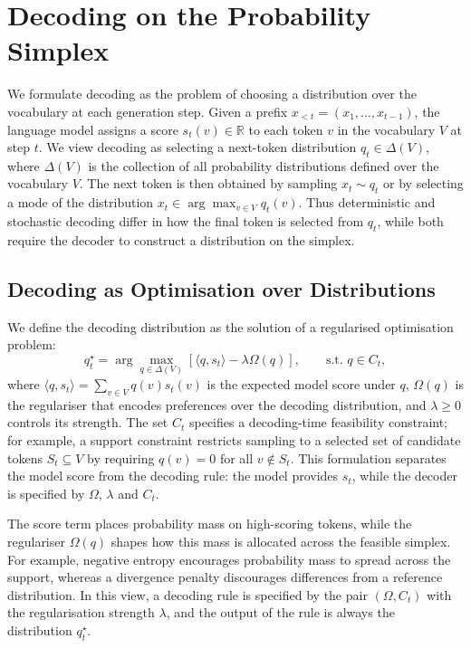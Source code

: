 \documentclass{article} %
\begin{document}
\section{Decoding on the Probability Simplex}
\label{sec:formulation}

We formulate decoding as the problem of choosing a distribution over the vocabulary at each generation step. Given a prefix $x_{<t}=(x_1,\ldots,x_{t-1})$, the language model assigns a score $s_t(v)\in\mathbb{R}$ to each
token $v$ in the vocabulary $V$ at step $t$. We view decoding as selecting a next-token distribution $q_t\in\Delta(V)$, where $\Delta (V)$ is the collection of all probability distributions defined over the vocabulary $V$.
The next token is then obtained by sampling $x_t\sim q_t$ or by selecting a mode of the distribution $x_t\in\arg\max_{v\in V} q_t(v)$. Thus deterministic and stochastic decoding differ in how the final token is selected from $q_t$, while both require the decoder to construct a distribution on the simplex.

\subsection{Decoding as Optimisation over Distributions}
\label{subsec:decoding_as_optimisation}

We define the decoding distribution as the solution of a regularised optimisation problem:
\begin{equation}
q_t^\star
=
\arg\max_{q\in\Delta(V)}
\left[
\langle q,s_t\rangle-\lambda\Omega(q)
\right],
\qquad
\text{s.t. } q\in C_t ,
\label{eq:master_problem}
\end{equation}
where $\langle q,s_t\rangle=\sum_{v\in V}q(v)s_t(v)$ is the expected model score under $q$, $\Omega(q)$ is the regulariser that encodes preferences
over the decoding distribution, and $\lambda\ge 0$ controls its strength. The set $C_t$ specifies a decoding-time feasibility constraint; for example, a support constraint restricts
sampling to a selected set of candidate tokens $S_t\subseteq V$ by
requiring $q(v)=0$ for all $v\notin S_t$. This formulation separates the model score from the decoding rule: the model provides $s_t$, while the decoder is specified by $\Omega$, $\lambda$ and $C_t$.

The score term places probability mass on high-scoring tokens, while the regulariser $\Omega(q)$ shapes how this mass is allocated across the feasible simplex. For example, negative entropy encourages probability mass to spread
across the support, whereas a divergence penalty discourages
differences from a reference distribution. In this view, a decoding rule is specified by the pair $(\Omega,C_t)$ with the regularisation strength $\lambda$, and the output of the rule is always the distribution $q_t^\star$.
\end{document}
